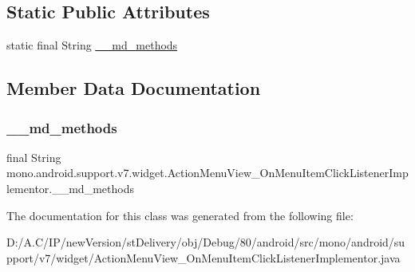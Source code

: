 \subsection*{Static Public Attributes}
\begin{DoxyCompactItemize}
\item 
static final String \hyperlink{classmono_1_1android_1_1support_1_1v7_1_1widget_1_1_action_menu_view___on_menu_item_click_listener_implementor_aa8cb9f08db4743ab028af01b66a66cf1}{\+\_\+\+\_\+md\+\_\+methods}
\end{DoxyCompactItemize}


\subsection{Member Data Documentation}
\mbox{\label{classmono_1_1android_1_1support_1_1v7_1_1widget_1_1_action_menu_view___on_menu_item_click_listener_implementor_aa8cb9f08db4743ab028af01b66a66cf1}} 
\subsubsection{\texorpdfstring{\+\_\+\+\_\+md\+\_\+methods}{\_\_md\_methods}}
{\footnotesize\ttfamily final String mono.\+android.\+support.\+v7.\+widget.\+Action\+Menu\+View\+\_\+\+On\+Menu\+Item\+Click\+Listener\+Implementor.\+\_\+\+\_\+md\+\_\+methods\hspace{0.3cm}{\ttfamily [static]}}



The documentation for this class was generated from the following file\+:\begin{DoxyCompactItemize}
\item 
D\+:/\+A.\+C/\+I\+P/new\+Version/st\+Delivery/obj/\+Debug/80/android/src/mono/android/support/v7/widget/Action\+Menu\+View\+\_\+\+On\+Menu\+Item\+Click\+Listener\+Implementor.\+java\end{DoxyCompactItemize}
